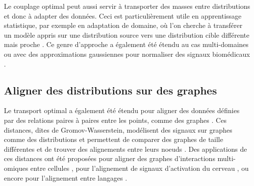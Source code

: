 \documentclass[11pt,a4paper]{article}
\begin{document}

Le couplage optimal peut aussi servir à transporter des masses entre
distributions et donc à adapter des données. Ceci est particulièrement utile en apprentissage statistique, par
exemple en adaptation de domaine, où l'on cherche à transférer un modèle appris
sur une distribution source vers une distribution cible différente mais proche
\cite{Courty2017}. Ce genre d'approche a également été étendu au cas
multi-domaines \cite{turrisi2022multi,montesuma2021wasserstein} ou avec des approximations gaussiennes pour
normaliser des signaux biomédicaux \cite{gnassounou2023convolutional,gnassounou2026psdnorm}.



\subsection{Aligner des distributions sur des graphes}{Le transport optimal a
également été étendu pour aligner des données définies par des relations paires à paires entre les points, comme des graphes \cite{Memoli2011,Solomon2015}. 
Ces distances, dites de Gromov-Wasserstein, modélisent des signaux sur graphes
comme des distributions et permettent de comparer des
graphes  de taille différentes et de trouver des alignements entre leurs noeuds \cite{Solomon2015,vayer2019optimal}.
Des applications de ces distances ont été proposées
pour aligner} des graphes d'interactions multi-omiques entre cellules
\cite{demetci2022scot}, pour l'alignement de signaux d'activation du cerveau
\cite{thual2022aligning}, ou encore pour l'alignement entre langages
\cite{alvarez2018gromov}.
\end{document}
